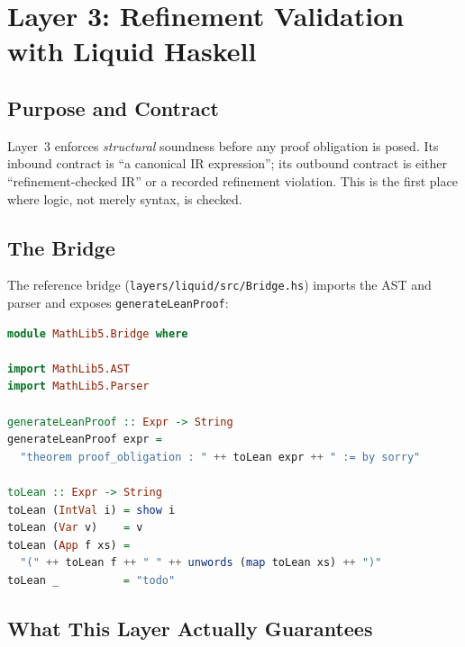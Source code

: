 \chapter{Layer 3: Refinement Validation with Liquid Haskell}
\label{ch:liquid}

\section{Purpose and Contract}
\label{sec:liq-purpose}

Layer~3 enforces \emph{structural} soundness before any proof obligation is
posed. Its inbound contract is ``a canonical IR expression''; its outbound
contract is either ``refinement-checked IR'' or a recorded refinement
violation. This is the first place where logic, not merely syntax, is checked.

\section{The Bridge}
\label{sec:liq-bridge}

The reference bridge (\texttt{layers/liquid/src/Bridge.hs}) imports the AST
and parser and exposes \texttt{generateLeanProof}:
\begin{lstlisting}[language=Haskell,caption={Liquid$\ensuremath{rightarrow}$Lean bridge (Bridge.hs).},label=lst:liq-bridge]
module MathLib5.Bridge where

import MathLib5.AST
import MathLib5.Parser

generateLeanProof :: Expr -> String
generateLeanProof expr =
  "theorem proof_obligation : " ++ toLean expr ++ " := by sorry"

toLean :: Expr -> String
toLean (IntVal i) = show i
toLean (Var v)    = v
toLean (App f xs) =
  "(" ++ toLean f ++ " " ++ unwords (map toLean xs) ++ ")"
toLean _          = "todo"
\end{lstlisting}

\section{What This Layer Actually Guarantees}
\label{sec:liq-guarantee}

